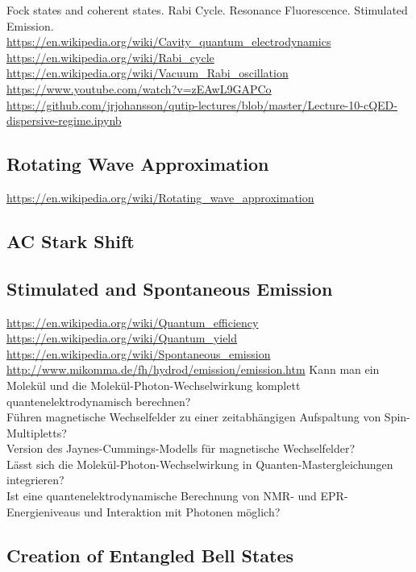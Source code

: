 \documentclass[9pt]{report}
\begin{document}
Fock states and coherent states. Rabi Cycle. Resonance Fluorescence. Stimulated Emission.\\
\url{https://en.wikipedia.org/wiki/Cavity_quantum_electrodynamics}\\
\url{https://en.wikipedia.org/wiki/Rabi_cycle}\\
\url{https://en.wikipedia.org/wiki/Vacuum_Rabi_oscillation}\\
\url{https://www.youtube.com/watch?v=zEAwL9GAPCo}\\
\url{https://github.com/jrjohansson/qutip-lectures/blob/master/Lecture-10-cQED-dispersive-regime.ipynb}


\subsection{Rotating Wave Approximation}
\url{https://en.wikipedia.org/wiki/Rotating_wave_approximation}\\

\subsection{AC Stark Shift}

\subsection{Stimulated and Spontaneous Emission}
\url{https://en.wikipedia.org/wiki/Quantum_efficiency}\\
\url{https://en.wikipedia.org/wiki/Quantum_yield}\\
\url{https://en.wikipedia.org/wiki/Spontaneous_emission}\\
\url{http://www.mikomma.de/fh/hydrod/emission/emission.htm}
Kann man ein Molekül und die Molekül-Photon-Wechselwirkung komplett quantenelektrodynamisch berechnen?\\
Führen magnetische Wechselfelder zu einer zeitabhängigen Aufspaltung von Spin-Multipletts?\\
Version des Jaynes-Cummings-Modells für magnetische Wechselfelder?\\
Lässt sich die Molekül-Photon-Wechselwirkung in Quanten-Mastergleichungen integrieren?\\
Ist eine quantenelektrodynamische Berechnung von NMR- und EPR-Energieniveaus und Interaktion mit Photonen möglich?\\

\subsection{Creation of Entangled Bell States}
\end{document}
